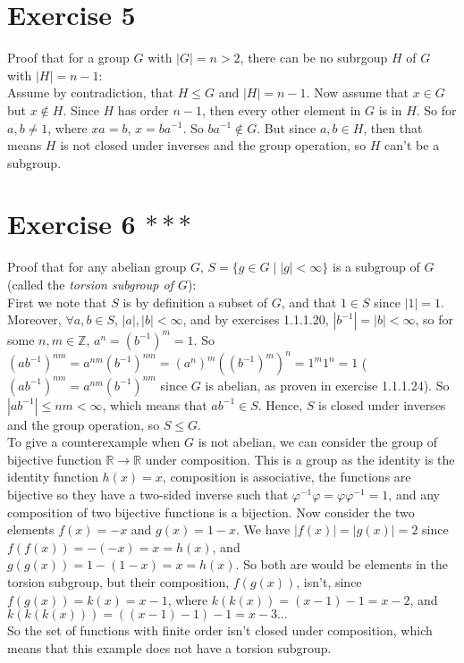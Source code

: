 \documentclass[12pt]{article}
\newcommand{\Z}{\mathbb{Z}}
\newcommand{\R}{\mathbb{R}}
\begin{document}
    \section*{Exercise 5}
    Proof that for a group $G$ with $|G| = n > 2$,
    there can be no subrgoup $H$ of $G$ with $|H| = n-1$: \\
    Assume by contradiction, that $H \leqslant G$ and $|H| = n-1$.
    Now assume that $x \in G$ but $x \notin H$.
    Since $H$ has order $n - 1$, then every other element in $G$ is in $H$.
    So for $a, b \neq 1$, where $xa = b$, $x = ba^{-1}$.
    So $ba^{-1} \notin G$.
    But since $a, b \in H$,
    then that means $H$ is not closed under inverses and the group operation,
    so $H$ can't be a subgroup.


    \section*{Exercise 6 $***$}
    Proof that for any abelian group $G$,
    $S = \{g \in G \mid |g| < \infty\}$ is a subgroup of $G$
    (called the \textit{torsion subgroup of $G$}): \\
    First we note that $S$ is by definition a subset of $G$,
    and that $1 \in S$ since $|1| = 1$. 
    Moreover, $\forall a, b \in S$, $|a|, |b| < \infty$,
    and by exercises 1.1.1.20, $|b^{-1}| = |b| < \infty$,
    so for some $n, m \in \Z$, $a^n = (b^{-1})^m = 1$.
    So $(ab^{-1})^{nm} = a^{nm}(b^{-1})^{nm}
    = (a^n)^m((b^{-1})^m)^n
    = 1^m1^n
    = 1$
    ($(ab^{-1})^{nm} = a^{nm}(b^{-1})^{nm}$ since $G$ is abelian,
    as proven in exercise 1.1.1.24).
    So $|ab^{-1}| \leqslant nm < \infty$,
    which means that $ab^{-1} \in S$.
    Hence, $S$ is closed under inverses and the group operation,
    so $S \leqslant G$. \\
    To give a counterexample when $G$ is not abelian,
    we can consider the group of bijective function $\R \to \R$
    under composition.
    This is a group as the identity is the identity function $h(x) = x$,
    composition is associative,
    the functions are bijective so they have a two-sided inverse
    such that $\varphi^{-1}\varphi = \varphi\varphi^{-1} = 1$,
    and any composition of two bijective functions is a bijection.
    Now consider the two elements $f(x) = -x$ and $g(x) = 1 - x$.
    We have $|f(x)| = |g(x)| = 2$
    since $f(f(x)) = -(-x) = x = h(x)$,
    and $g(g(x)) = 1 - (1 - x) = x = h(x)$.
    So both are would be elements in the torsion subgroup,
    but their composition, $f(g(x))$, isn't,
    since $f(g(x)) = k(x) = x - 1$, 
    where $k(k(x)) = (x - 1) - 1 = x - 2$,
    and $k(k(k(x))) = ((x - 1) - 1) - 1 = x - 3 \dots$ \\
    So the set of functions with finite order isn't closed under composition,
    which means that this example does not have a torsion subgroup.
\end{document}
